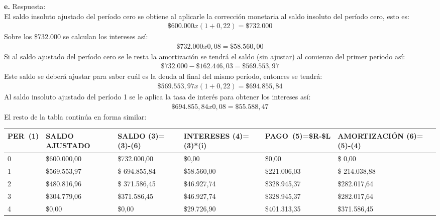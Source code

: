 \textbf{e.	}Respuesta:\\
El saldo insoluto ajustado del período cero se obtiene al aplicarle la corrección monetaria al saldo insoluto del período cero, esto es:
\begin{align*}
	\$600.000 x (1+0,22)=\$732.000
\end{align*}
Sobre los \$732.000 se calculan los intereses así:
\begin{align*}
	\$732.000 x 0,08=\$58.560,00 
\end{align*}
Si al saldo ajustado del período cero se le resta la amortización se tendrá el saldo (sin ajustar) al comienzo del primer período así:
\begin{align*}
	\$732.000-\$162.446,03=\$569.553,97 
\end{align*}
Este saldo se deberá ajustar para saber cuál es la deuda al final del mismo período, entonces se tendrá:
\begin{align*}
	\$569.553,97 x (1 +0,22)=\$694.855,84 
\end{align*}
Al saldo insoluto ajustado del período 1 se le aplica la tasa de interés para obtener los intereses así:
\begin{align*}
	\$694.855,84 x 0,08 =\$55.588,47
\end{align*}
El resto de la tabla continúa en forma similar:

\begin{spacing}{1.1}
    \begin{center}
        \begin{tabular}{|p{1cm}|p{3cm}|p{2cm}|p{2cm}|p{2cm}||p{3cm}|}
        \hline 
        \rowcolor{white!50}
            \textbf{PER\ (1)} & \textbf{SALDO AJUSTADO } & \textbf{SALDO (3)=(3)-(6)} & \textbf{INTERESES  (4)=(3)*(i)}& \textbf{PAGO\ (5)=\$R-\$L }& \textbf{AMORTIZACIÓN  (6)=(5)-(4)} \\ \hline                        

            0 & \$600.000,00 & \$732.000,00 & \$0,00 & \$0,00 & \$ 0,00\\ \hline 
            1 & \$569.553,97  &\$ 694.855,84  & \$58.560,00  & \$221.006,03 & \$ 214.038,88 \\ \hline
            2 & \$480.816,96  &\$ 371.586,45  & \$46.927,74  & \$328.945,37 &\$282.017,64 \\ \hline
            3 & \$304.779,06 & \$371.586,45  & \$46.927,74 & \$328.945,37 & \$282.017,64 \\ \hline
            4 & \$0,00  & \$0,00  & \$29.726,90  & \$401.313,35 & \$371.586,45\\ \hline
          

 
\end{tabular}
\end{center}
\end{spacing}


